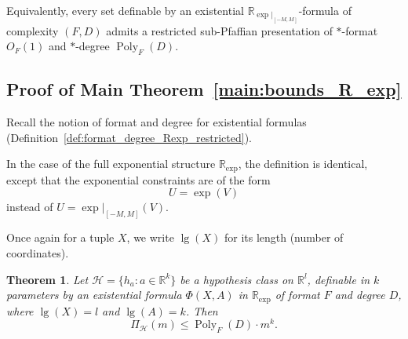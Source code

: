 \documentclass[11pt]{article}
\theoremstyle{plain}
\newtheorem{theorem}{Theorem}[section]
\theoremstyle{definition}
\theoremstyle{remark}
\newcommand{\R}{\mathbb{R}}
\newcommand{\cH}{\mathcal{H}}
\newcommand{\Poly}{\operatorname{Poly}}
\begin{document}
Equivalently, every set definable by an existential
$\R_{\exp|_{[-M,M]}}$-formula of complexity $(F,D)$ admits a restricted
sub-Pfaffian presentation of $*$-format $O_F(1)$ and
$*$-degree $\Poly_F(D)$.

\subsection{Proof of Main Theorem~\ref{main:bounds_R_exp}}
\label{app:proof-main-three}

Recall the notion of format and degree for existential formulas
(Definition~\ref{def:format_degree_Rexp_restricted}).  

In the case of the full exponential structure \(\R_{\exp}\), the
definition is identical, except that the exponential constraints are of
the form
\[
  U=\exp(V)
\]
instead of \(U=\exp|_{[-M,M]}(V)\).

Once again for a tuple \(X\), we write \(\lg(X)\) for its length (number of coordinates).

\begin{theorem}
\label{thm:shatter_Rexp}
Let \(\cH=\{h_a:a\in \R^k\}\) be a hypothesis class on \(\R^l\), definable in
\(k\) parameters by an existential formula \(\Phi(X,A)\) in \(\R_{\exp}\) of
format \(F\) and degree \(D\), where \(\lg(X)=l\) and \(\lg(A)=k\). Then
\[
  \Pi_{\cH}(m) \le \Poly_F(D)\cdot m^k .
\]
\end{theorem}
\end{document}
